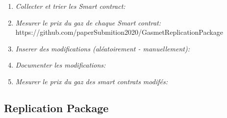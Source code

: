 \begin{enumerate}
  
  \item \emph{Collecter et trier les Smart contract:}
  
  \item \emph{Mesurer le prix du gaz de chaque Smart contrat:}
  https://github.com/paperSubmition2020/GasmetReplicationPackage

  
  \item \emph{Inserer des modifications (aléatoirement - manuellement):}
  
  \item \emph{Documenter les modifications:}


  \item \emph{Mesurer le prix du gaz des smart contrats modifés:} 
  
\end{enumerate}




\subsection{Replication Package}
\label{sec:Replication Package}
